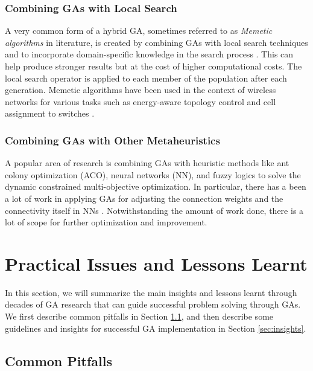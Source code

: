 \documentclass[journal]{IEEEtran}
\begin{document}
\vspace{2mm}
\subsubsection{Combining GAs with Local Search}

A very common form of a hybrid GA, sometimes referred to as \textit{Memetic algorithms} \cite{moscato2010modern} in literature, is created by combining GAs with local search techniques and to incorporate domain-specific knowledge in the search process \cite{sastry2005genetic}. This can help produce stronger results but at the cost of higher computational costs. The local search operator is applied to each member of the population after each generation. Memetic algorithms have been used in the context of wireless networks for various tasks such as energy-aware topology control \cite{konstantinidis2007energy} and cell assignment to switches \cite{quintero2002memetic}.

\vspace{2mm}
\subsubsection{Combining GAs with Other Metaheuristics}

A popular area of research is combining GAs with heuristic methods like ant colony optimization (ACO), neural networks (NN), and fuzzy logics to solve the dynamic constrained multi-objective optimization. In particular, there has a been a lot of work in applying GAs for adjusting the connection weights and the connectivity itself in NNs \cite{whitley1990genetic}. Notwithstanding the amount of work done, there is a lot of scope for further optimization and improvement. 

\section{Practical Issues and Lessons Learnt}
\label{sec:lessons}

In this section, we will summarize the main insights and lessons learnt through decades of GA research that can guide successful problem solving through GAs. We first describe common pitfalls in Section \ref{sec:pitfalls}, and then describe some guidelines and insights for successful GA implementation in Section \ref{sec:insights}.

\subsection{Common Pitfalls}
\label{sec:pitfalls}
\end{document}
